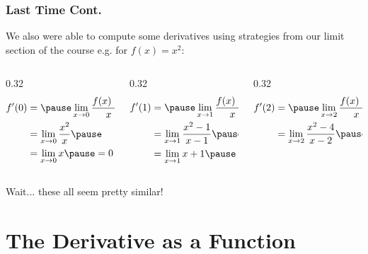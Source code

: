 \documentclass{ltx-talk}
\begin{document}
\begin{frame}
  \frametitle{Last Time Cont.}
  We also were able to compute some derivatives using strategies from our limit section of the course \pause e.g. for $f(x) = x^2$: \pause
  \begin{columns}
    \begin{column}{0.32\textwidth}
      \begin{align}
        f'(0) &= \pause \lim\limits_{x \rightarrow 0} \dfrac{f(x) - f(0)}{x - 0} \pause \\
              &= \lim\limits_{x \rightarrow 0} \dfrac{x^2}{x} \pause \\
              &= \lim\limits_{x \rightarrow 0} x \pause = 0
      \end{align}
    \end{column}

    \begin{column}{0.32\textwidth}
      \begin{align}
        f'(1) &= \pause \lim\limits_{x \rightarrow 1} \dfrac{f(x) - f(1)}{x - 1} \pause \\
              &= \lim\limits_{x \rightarrow 1} \dfrac{x^2 - 1}{x - 1} \pause \\
              &= \lim\limits_{x \rightarrow 1} x + 1 \pause = 1 + 1 = 2
      \end{align}
    \end{column}

    \begin{column}{0.32\textwidth}
      \begin{align}
        f'(2) &= \pause \lim\limits_{x \rightarrow 2} \dfrac{f(x) - f(2)}{x - 2} \pause \\
              &= \lim\limits_{x \rightarrow 2} \dfrac{x^2 - 4}{x - 2} \pause \\
      \end{align}
      \pause
    \end{column}
  \end{columns}

  Wait... these all seem pretty similar!
\end{frame}

\section{The Derivative as a Function}
\end{document}

